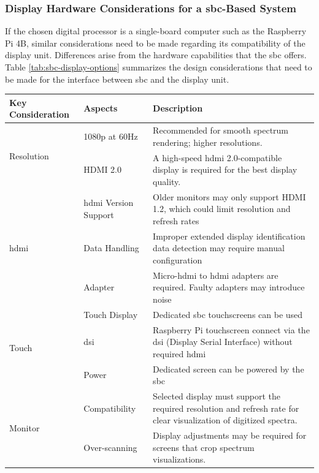\documentclass[class=report,11pt,crop=false]{standalone}
\begin{document}
	\subsubsection{Display Hardware Considerations for a \acrshort{sbc}-Based System}
	
	If the chosen digital processor is a single-board computer such as the Raspberry Pi 4B, similar considerations need to be made regarding its compatibility of the display unit. Differences arise from the hardware capabilities that the \acrshort{sbc} offers. Table \ref{tab:sbc-display-options} summarizes the design considerations that need to be made for the interface between \acrshort{sbc} and the display unit.
	
	\begin{table}[ht!]
		\centering
		\begin{tabular}{|m{5em}|m{10em}|m{24em}|}
			\hline
			\cellcolor{cyan!25}\textbf{Key Consideration}	&	\cellcolor{cyan!25}\textbf{Aspects}	& \cellcolor{cyan!25}\textbf{Description}\\
			\hline
			\multirow{2}{*}{Resolution} 
			& 1080p at 60Hz & Recommended for smooth spectrum rendering; higher resolutions. \\
			\cline{2-3}
			& HDMI 2.0 & A high-speed \acrshort{hdmi} 2.0-compatible display is required for the best display quality. \\
			\hline
			
			\multirow{3}{*}{\acrshort{hdmi}} 
			& \acrshort{hdmi} Version Support & Older monitors may only support HDMI 1.2, which could limit resolution and refresh rates \\
			\cline{2-3}
			& Data Handling & Improper extended display identification data detection may require manual configuration \\
			\cline{2-3}
			& Adapter	& Micro-\acrshort{hdmi} to \acrshort{hdmi} adapters are required. Faulty adapters may introduce noise\\
			\hline
			
			\multirow{3}{*}{Touch} 
			& Touch Display & Dedicated \acrshort{sbc} touchscreens can be used \\
			\cline{2-3}
			& \acrshort{dsi} & Raspberry Pi touchscreen connect via the \acrshort{dsi} (Display Serial Interface) without required \acrshort{hdmi}\\
			\cline{2-3}
			& Power & Dedicated screen can be powered by the \acrshort{sbc}\\
			\hline
			
			\multirow{2}{*}{Monitor} 
			& Compatibility & Selected display must support the required resolution and refresh rate for clear visualization of digitized spectra. \\
			\cline{2-3}
			& Over-scanning & Display adjustments may be required for screens that crop spectrum visualizations. \\
			\hline
						

\end{tabular}
\end{table}
\end{document}
